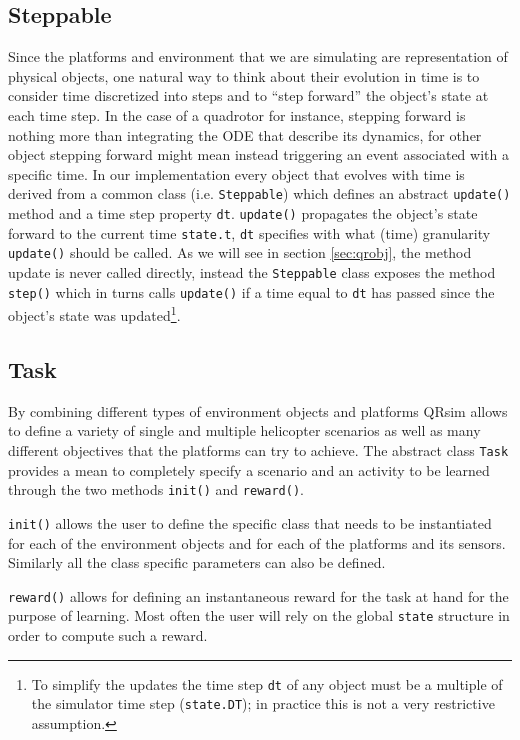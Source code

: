 \documentclass[a4paper,11pt]{report}
\newcommand{\sname}{QRsim\xspace}
\begin{document}
\subsection{Steppable}

Since the platforms and environment that we are simulating are representation of physical objects, one natural way to think about their evolution in time is to consider time discretized into steps and to ``step forward'' the object's state at each time step. In the case of a quadrotor for instance, stepping forward is nothing more than integrating the ODE that describe its dynamics, for other object stepping forward might mean instead triggering an event associated with a specific time.
In our implementation every object that evolves with time is derived from a common class (i.e. \texttt{Steppable}) which defines an abstract \texttt{update()} method and a time step property \texttt{dt}. \texttt{update()} propagates the object's state forward to the current time \texttt{state.t}, \texttt{dt} specifies with what (time) granularity \texttt{update()} should be called. As we will see in section \ref{sec:qrobj}, the method update is never called directly, instead the  \texttt{Steppable} class exposes the method \texttt{step()} which in turns calls \texttt{update()} if a time equal to \texttt{dt} has passed since the object's state was updated\footnote{To simplify the updates the time step \texttt{dt} of any object must be a multiple of the simulator time step (\texttt{state.DT}); in practice this is not a very restrictive assumption.}.

\subsection{Task}

By combining different types of environment objects and platforms \sname allows to define a variety of single and multiple helicopter scenarios as well as many different objectives that the platforms can try to achieve. 
The abstract class \texttt{Task} provides a mean to completely specify a scenario and an activity to be learned through the two methods \texttt{init()} and \texttt{reward()}.

\texttt{init()} allows the user to define the specific class that needs to be instantiated for each of the environment objects and for each of the platforms and its sensors. 
Similarly all the class specific parameters can also be defined.

\texttt{reward()} allows for defining an instantaneous reward for the task at hand for the purpose of learning. Most often the user will rely on the global \texttt{state} structure in order to compute such a reward.
\end{document}
